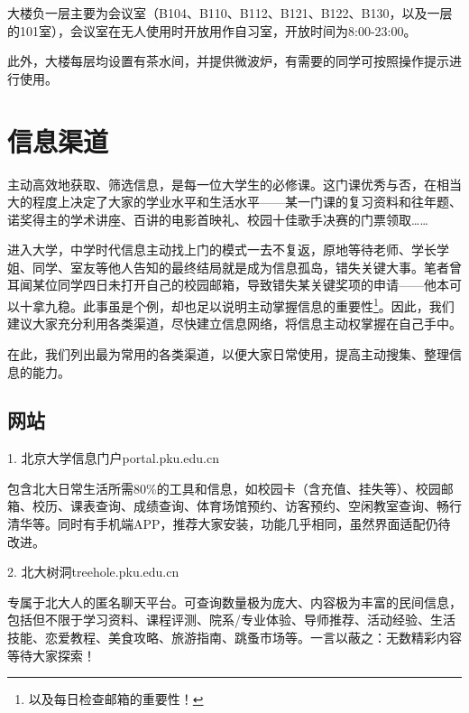 \documentclass[11pt,oneside]{book}
\begin{document}
\vspace{10pt}

大楼负一层主要为会议室（B104、B110、B112、B121、B122、B130，以及一层的101室），会议室在无人使用时开放用作自习室，开放时间为8:00-23:00。

\vspace{10pt}

此外，大楼每层均设置有茶水间，并提供微波炉，有需要的同学可按照操作提示进行使用。

\section{信息渠道}
主动高效地获取、筛选信息，是每一位大学生的必修课。这门课优秀与否，在相当大的程度上决定了大家的学业水平和生活水平——某一门课的复习资料和往年题、诺奖得主的学术讲座、百讲的电影首映礼、校园十佳歌手决赛的门票领取……

\vspace{10pt}

进入大学，中学时代信息主动找上门的模式一去不复返，原地等待老师、学长学姐、同学、室友等他人告知的最终结局就是成为信息孤岛，错失关键大事。笔者曾耳闻某位同学四日未打开自己的校园邮箱，导致错失某关键奖项的申请——他本可以十拿九稳。此事虽是个例，却也足以说明主动掌握信息的重要性\footnote{以及每日检查邮箱的重要性！}。因此，我们建议大家充分利用各类渠道，尽快建立信息网络，将信息主动权掌握在自己手中。

\vspace{10pt}

在此，我们列出最为常用的各类渠道，以便大家日常使用，提高主动搜集、整理信息的能力。

\subsection{网站}

1. 北京大学信息门户\quad portal.pku.edu.cn

包含北大日常生活所需80\%的工具和信息，如校园卡（含充值、挂失等）、校园邮箱、校历、课表查询、成绩查询、体育场馆预约、访客预约、空闲教室查询、畅行清华等。同时有手机端APP，推荐大家安装，功能几乎相同，虽然界面适配仍待改进。

\vspace{10pt}

2. 北大树洞\quad treehole.pku.edu.cn

专属于北大人的匿名聊天平台。可查询数量极为庞大、内容极为丰富的民间信息，包括但不限于学习资料、课程评测、院系/专业体验、导师推荐、活动经验、生活技能、恋爱教程、美食攻略、旅游指南、跳蚤市场等。一言以蔽之：无数精彩内容等待大家探索！
\end{document}
